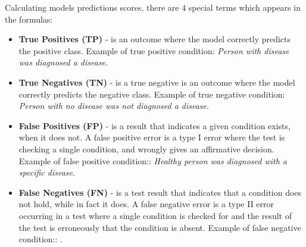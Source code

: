 Calculating models predictions scores, there are 4 special terms which appears in the formulas:
\begin{itemize}
    \item \textbf{True Positives (TP)} - is an outcome where the model correctly predicts the positive class. Example of true positive condition: \textit{Person with disease was diagnosed a disease}.
    \item \textbf{True Negatives (TN)} - is a true negative is an outcome where the model correctly predicts the negative class. Example of true negative condition: \textit{Person with no disease was not diagnosed a disease}.
    \item \textbf{False Positives (FP)} - is a result that indicates a given condition exists, when it does not. A false positive error is a type I error where the test is checking a single condition, and wrongly gives an affirmative decision.  Example of false positive condition:: \textit{Healthy person was diagnosed with a specific disease}. 
    \item \textbf{False Negatives (FN)} - is a test result that indicates that a condition does not hold, while in fact it does. A false negative error is a type II error occurring in a test where a single condition is checked for and the result of the test is erroneously that the condition is absent.  Example of false negative condition:: .
\end{itemize}

